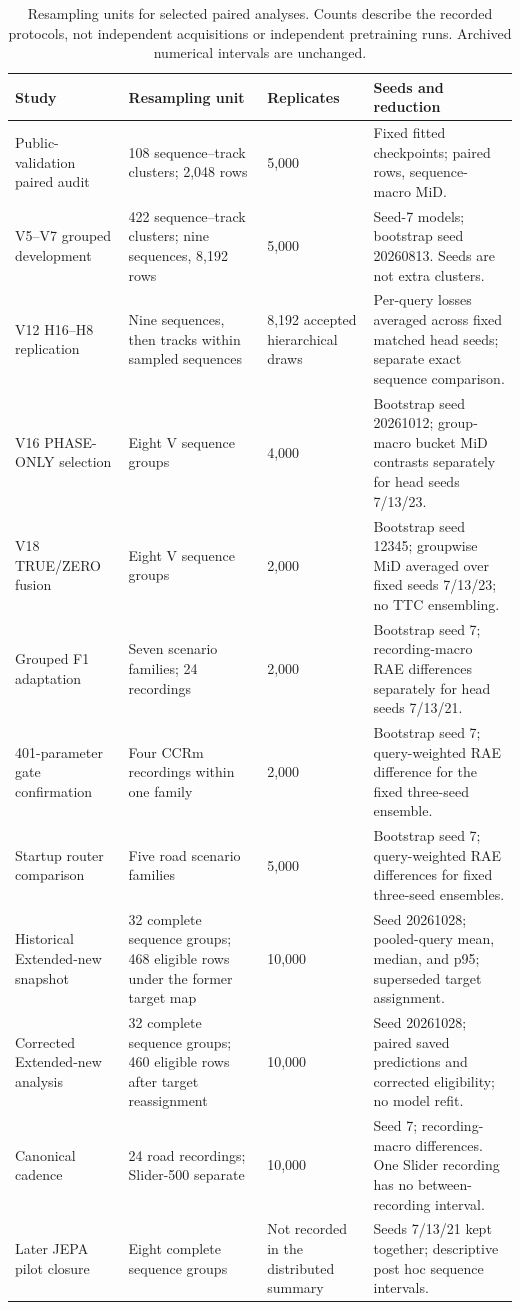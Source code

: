 \begin{table}[H]
\centering\scriptsize
\caption{Resampling units for selected paired analyses. Counts describe the recorded protocols, not independent acquisitions or independent pretraining runs. Archived numerical intervals are unchanged. }
\label{tab:audit-bootstrap-units}
\begin{tabularx}{\linewidth}{@{}p{.20\linewidth}p{.23\linewidth}p{.15\linewidth}X@{}}
\toprule
Study & Resampling unit & Replicates & Seeds and reduction \\
\midrule
Public-validation paired audit & 108 sequence--track clusters; 2,048 rows & 5,000 & Fixed fitted checkpoints; paired rows, sequence-macro MiD. \\
V5--V7 grouped development & 422 sequence--track clusters; nine sequences, 8,192 rows & 5,000 & Seed-7 models; bootstrap seed 20260813. Seeds are not extra clusters. \\
V12 H16--H8 replication & Nine sequences, then tracks within sampled sequences & 8,192 accepted hierarchical draws & Per-query losses averaged across fixed matched head seeds; separate exact sequence comparison. \\
V16 PHASE-ONLY selection & Eight V sequence groups & 4,000 & Bootstrap seed 20261012; group-macro bucket MiD contrasts separately for head seeds 7/13/23. \\
V18 TRUE/ZERO fusion & Eight V sequence groups & 2,000 & Bootstrap seed 12345; groupwise MiD averaged over fixed seeds 7/13/23; no TTC ensembling. \\
Grouped F1 adaptation & Seven scenario families; 24 recordings & 2,000 & Bootstrap seed 7; recording-macro RAE differences separately for head seeds 7/13/21. \\
401-parameter gate confirmation & Four CCRm recordings within one family & 2,000 & Bootstrap seed 7; query-weighted RAE difference for the fixed three-seed ensemble. \\
Startup router comparison & Five road scenario families & 5,000 & Bootstrap seed 7; query-weighted RAE differences for fixed three-seed ensembles. \\
Historical Extended-new snapshot & 32 complete sequence groups; 468 eligible rows under the former target map & 10,000 & Seed 20261028; pooled-query mean, median, and p95; superseded target assignment. \\
Corrected Extended-new analysis & 32 complete sequence groups; 460 eligible rows after target reassignment & 10,000 & Seed 20261028; paired saved predictions and corrected eligibility; no model refit. \\
Canonical cadence & 24 road recordings; Slider-500 separate & 10,000 & Seed 7; recording-macro differences. One Slider recording has no between-recording interval. \\
Later JEPA pilot closure & Eight complete sequence groups & Not recorded in the distributed summary & Seeds 7/13/21 kept together; descriptive post hoc sequence intervals. \\
\bottomrule
\end{tabularx}
\end{table}
